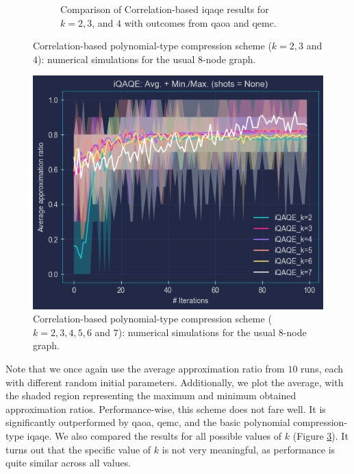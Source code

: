 \begin{figure}[H]
\begin{subfigure}[t]{0.495\textwidth}
      \caption{Comparison of Correlation-based \acrshort{iqaqe} results for $k=2, 3$, and $4$ with outcomes from \acrshort{qaoa} and \acrshort{qemc}.}
      \label{fig:Correlation/k=2,3,4}
  \end{subfigure}
  \caption{Correlation-based polynomial-type compression scheme ($k=2, 3$ and $4$): numerical simulations for the usual $8$-node graph.}
  \label{fig:Correlation-based}
\end{figure}

\footnotetext[\value{footnote}]{This refers to the scenario where only $1$'s are fixed, not $0$'s.}

\clearpage

\begin{figure}[H]
  \centering
  \includegraphics[width=\textwidth]{Figures/Chapter_5/Correlation-based/All_k's.png}
  \caption{Correlation-based polynomial-type compression scheme ($k = 2, 3, 4, 5, 6$ and $7$): numerical simulations for the usual $8$-node graph.}
  \label{fig:All_k's}
\end{figure}

Note that we once again use the average approximation ratio from $10$ runs, each with different random initial parameters. Additionally, we plot the average, with the shaded region representing the maximum and minimum obtained approximation ratios. Performance-wise, this scheme does not fare well. It is significantly outperformed by \acrshort{qaoa}, \acrshort{qemc}, and the basic polynomial compression-type \acrshort{iqaqe}. We also compared the results for all possible values of $k$ (Figure \ref{fig:All_k's}). It turns out that the specific value of $k$ is not very meaningful, as performance is quite similar across all values.

